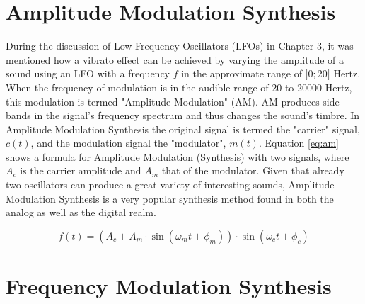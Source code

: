 \section{Amplitude Modulation Synthesis}

During the discussion of Low Frequency Oscillators (LFOs) in Chapter 3, it was mentioned how a vibrato effect can be achieved by varying the amplitude of a sound using an LFO with a frequency $f$ in the approximate range of $]0;20]$ Hertz. When the frequency of modulation is in the audible range of 20 to 20000 Hertz, this modulation is termed "Amplitude Modulation" (AM). AM produces side-bands in the signal's frequency spectrum and thus changes the sound's timbre. In Amplitude Modulation Synthesis the original signal is termed the "carrier" signal, $c(t)$, and the modulation signal the "modulator", $m(t)$. Equation \ref{eq:am} shows a formula for Amplitude Modulation (Synthesis) with two signals, where $A_{c}$ is the carrier amplitude and $A_{m}$ that of the modulator. Given that already two oscillators can produce a great variety of interesting sounds, Amplitude Modulation Synthesis is a very popular synthesis method found in both the analog as well as the digital realm.

\begin{equation}
  f(t) = (A_{c} + A_{m}\cdot\sin(\omega_{m} t + \phi_{m}))\cdot\sin(\omega_{c} t + \phi_{c})
  \label{eq:am}
\end{equation}

\section{Frequency Modulation Synthesis}

